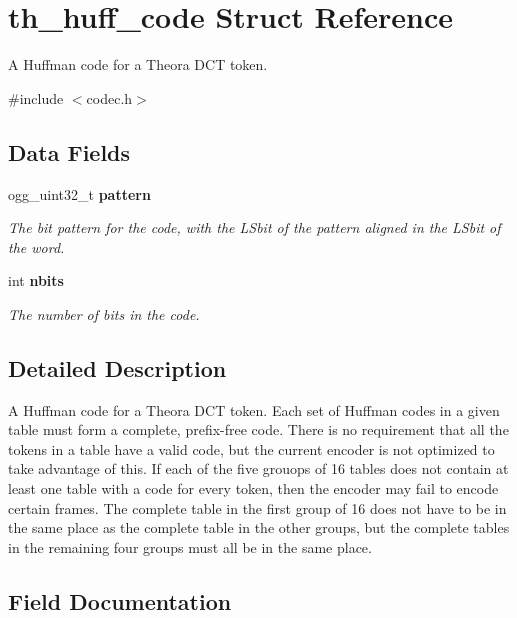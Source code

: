 \section{th\_\-huff\_\-code Struct Reference}
\label{structth__huff__code}


A Huffman code for a Theora DCT token.  




{\ttfamily \#include $<$codec.h$>$}

\subsection*{Data Fields}
\begin{DoxyCompactItemize}
\item 
ogg\_\-uint32\_\-t {\bf pattern}
\begin{DoxyCompactList}\small\item\em The bit pattern for the code, with the LSbit of the pattern aligned in the LSbit of the word. \item\end{DoxyCompactList}\item 
int {\bf nbits}
\begin{DoxyCompactList}\small\item\em The number of bits in the code. \item\end{DoxyCompactList}\end{DoxyCompactItemize}


\subsection{Detailed Description}
A Huffman code for a Theora DCT token. Each set of Huffman codes in a given table must form a complete, prefix-\/free code. There is no requirement that all the tokens in a table have a valid code, but the current encoder is not optimized to take advantage of this. If each of the five grouops of 16 tables does not contain at least one table with a code for every token, then the encoder may fail to encode certain frames. The complete table in the first group of 16 does not have to be in the same place as the complete table in the other groups, but the complete tables in the remaining four groups must all be in the same place. 

\subsection{Field Documentation}
